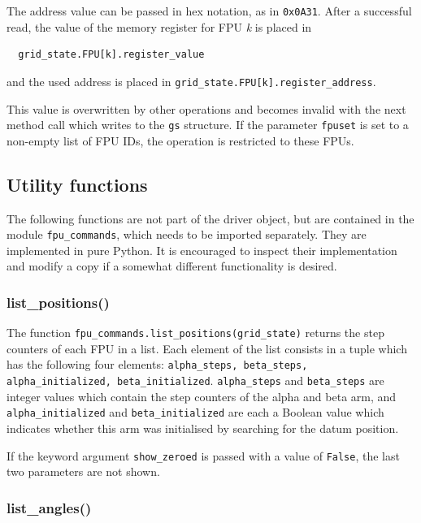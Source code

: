 \documentclass[11pt,a4paper]{scrartcl}
\begin{document}
The address value can be passed in hex notation,
as in \texttt{0x0A31}. After a successful read,
the value of the memory register for FPU \emph{k}
is placed in

\begin{verbatim}
  grid_state.FPU[k].register_value
\end{verbatim}
and the used address is placed in
\verb+grid_state.FPU[k].register_address+.


This value is overwritten by other operations and becomes invalid with
the next method call which writes to the \texttt{gs} structure.  If
the parameter \texttt{fpuset} is set to a non-empty list of FPU IDs,
the operation is restricted to these FPUs.


\subsection{Utility functions}

The following functions are not part of the driver object, but are
contained in the module \texttt{fpu\_commands}, which needs to be
imported separately. They are implemented in pure Python. It is
encouraged to inspect their implementation and modify a copy if a
somewhat different functionality is desired.

\subsubsection{list\_positions()}
\label{sec:listpositions}
 
The function \texttt{fpu\_commands.list\_positions(grid\_state)}
returns the step counters of each FPU in a list.  Each element of the
list consists in a tuple which has the following four elements:
\texttt{alpha\_steps, beta\_steps, alpha\_initialized,
  beta\_initialized}. \texttt{alpha\_steps} and \texttt{beta\_steps}
are integer values which contain the step counters of the alpha and
beta arm, and \texttt{alpha\_initialized} and
\texttt{beta\_initialized} are each a Boolean value which indicates
whether this arm was initialised by searching for the datum position.

If the keyword argument \texttt{show\_zeroed} is passed with a value of
\texttt{False}, the last two parameters are not shown.

\subsubsection{list\_angles()}
\label{sec:listangles}
\end{document}
